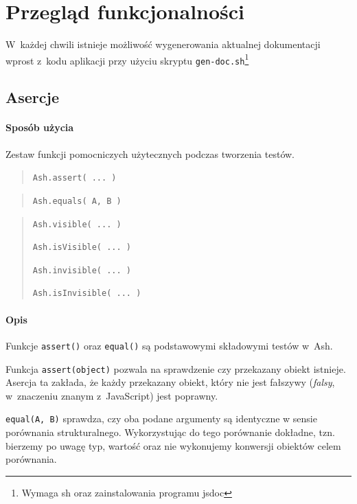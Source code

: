 \documentclass[brudnopis]{xmgr}
\begin{document}
\chapter{Przegląd funkcjonalności}

W~każdej chwili istnieje możliwość wygenerowania aktualnej dokumentacji wprost z~kodu aplikacji przy użyciu skryptu \texttt{gen-doc.sh}\footnote{Wymaga sh oraz zainstalowania programu jsdoc}

\section{Asercje}

\subsubsection{Sposób użycia}

Zestaw funkcji pomocniczych użytecznych podczas tworzenia testów.

\begin{quote}
  \texttt{Ash.assert( ... )} 
\end{quote}

\begin{quote}
  \texttt{Ash.equals( A, B )} 
\end{quote}

\begin{quote}
  \texttt{Ash.visible( ... )} 

  \texttt{Ash.isVisible( ... )}

  \texttt{Ash.invisible( ... )}

  \texttt{Ash.isInvisible( ... )}
\end{quote}

\subsubsection{Opis}

Funkcje \texttt{assert()} oraz \texttt{equal()} są podstawowymi składowymi testów w~Ash.

Funkcja \texttt{assert(object)} pozwala na sprawdzenie czy przekazany obiekt istnieje. Asercja ta zakłada, że każdy przekazany obiekt, który nie jest fałszywy (\textit{falsy}, w~znaczeniu znanym z~JavaScript) jest poprawny. 

\texttt{equal(A, B)} sprawdza, czy oba podane argumenty są identyczne w sensie porównania strukturalnego. Wykorzystując do tego porównanie dokładne, tzn. bierzemy po uwagę typ, wartość oraz nie wykonujemy konwersji obiektów celem porównania.
\end{document}
